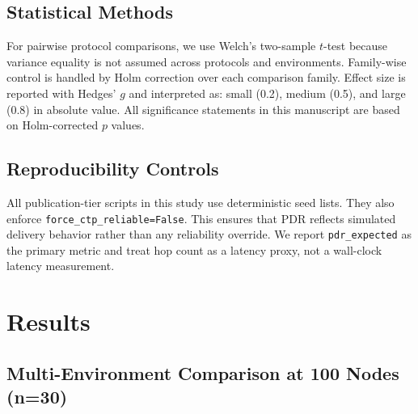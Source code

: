 \documentclass[sensors,article,submit,moreauthors,pdftex]{Definitions/mdpi}
\begin{document}
\subsection{Statistical Methods}
For pairwise protocol comparisons, we use Welch's two-sample $t$-test because variance equality is not assumed across protocols and environments. Family-wise control is handled by Holm correction over each comparison family. Effect size is reported with Hedges' $g$ and interpreted as: small (0.2), medium (0.5), and large (0.8) in absolute value. All significance statements in this manuscript are based on Holm-corrected $p$ values.

\subsection{Reproducibility Controls}
All publication-tier scripts in this study use deterministic seed lists. They also enforce \texttt{force\_ctp\_reliable=False}. This ensures that PDR reflects simulated delivery behavior rather than any reliability override. We report \texttt{pdr\_expected} as the primary metric and treat hop count as a latency proxy, not a wall-clock latency measurement.

\section{Results}
\subsection{Multi-Environment Comparison at 100 Nodes (n=30)}
\begin{table}[H]
\caption{PDR by environment at 100 nodes (mean $\pm$ std; std reported as population standard deviation, ddof=0).}
\label{tab:pdr100}
\centering
{}
\end{table}
\end{document}
